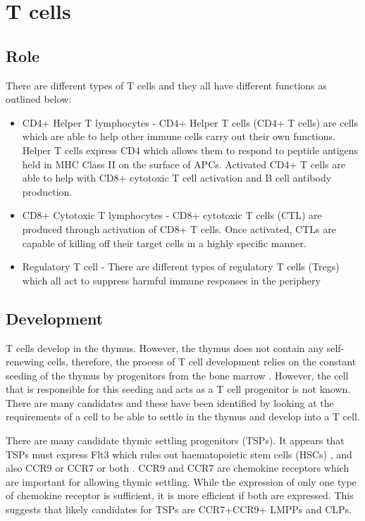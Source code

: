 \section{T cells}
\subsection{Role}
\label{subsec:Tcellfunctions}

There are different types of T cells and they all have different functions as outlined below:


\begin{itemize}
\item CD4+ Helper T lymphocytes - CD4+ Helper T cells (CD4+ T cells) are cells which are able to help other immune cells carry out their own functions. 
Helper T cells express CD4 which allows them to respond to peptide antigens held in MHC Class II on the surface of APCs. 
Activated CD4+ T cells are able to help with CD8+ cytotoxic T cell activation and B cell antibody production.
\item CD8+ Cytotoxic T lymphocytes - CD8+ cytotoxic T cells (CTL) are produced through activation of CD8+ T cells.
Once activated, CTLs are capable of killing off their target cells in a highly specific manner.
\item Regulatory T cell - There are different types of regulatory T cells (Tregs) which all act to suppress harmful immune responses in the periphery
\end{itemize}


\subsection{Development}

T cells develop in the thymus.
However, the thymus does not contain any self-renewing cells, therefore, the process of T cell development relies on the constant seeding of the thymus by progenitors from the bone marrow \citep{Zlotoff2011, Heinzel2007}.
However, the cell that is responsible for this seeding and acts as a T cell progenitor is not known.
There are many candidates and these have been identified by looking at the requirements of a cell to be able to settle in the thymus and develop into a T cell.

There are many candidate thymic settling progenitors (TSPs).
It appears that TSPs must express Flt3 which rules out haematopoietic stem cells (HSCs) \citep{Zlotoff2011}, and also CCR9 or CCR7 or both \citep{Zlotoff2010}.
CCR9 and CCR7 are chemokine receptors which are important for allowing thymic settling. 
While the expression of only one type of chemokine receptor is sufficient, it is more efficient if both are expressed.
This suggests that likely candidates for TSPs are CCR7+CCR9+ LMPPs and CLPs\citep{Zlotoff2011}.

